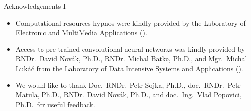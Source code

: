 \begin{frame}{Acknowledgements I}
\begin{itemize}
\item<1-3> Computational resources \alert{hypnos} were kindly provided by
  \alert{the Laboratory of Electronic and MultiMedia Applications}
  (\alert{}).
\item<2-3> Access to pre-trained  convolutional neural networks was
  kindly provided by
  \alert{RNDr.\ David Novák},
  \alert{Ph.D., RNDr.\ Michal Batko, Ph.D.}, and
  \alert{Mgr.\ Michal Lukáč}
  from \alert{the Laboratory of Data Intensive Systems and Applications}
  (\alert{}).
\item<3-3> We would like to thank
  \alert{Doc.\ RNDr.\ Petr Sojka, Ph.D.}, 
  \alert{doc.\ RNDr.\ Petr Matula, Ph.D.},
  \alert{RNDr.\ David Novák, Ph.D.}, and
  \alert{doc.\ Ing.\ Vlad Popovici, Ph.D.}\ for useful feedback.
\end{itemize}

\begin{center}%
%
%
%
\end{center}%
\end{frame}

